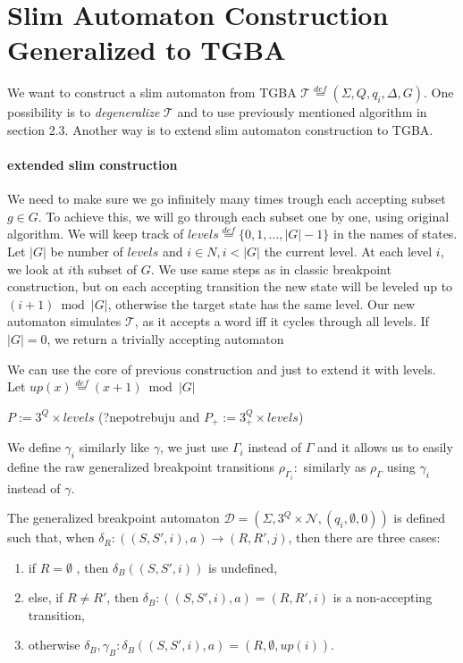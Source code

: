 \documentclass[
	digital
nolof, nolot
]{fithesis3}
\newcommand{\cD}{\mathcal{D}}
\newcommand{\cN}{\mathcal{N}}
\newcommand{\cT}{\mathcal{T}}
\newcommand{\eqdef}{\overset{def}{=}}
\begin{document}
			
			\section{Slim Automaton Construction Generalized to TGBA}
			We want to construct a slim automaton from TGBA $\cT\eqdef(\Sigma, Q, q_i, \Delta, G)$.
			One possibility is to \emph{degeneralize} $\cT$ and to use previously mentioned algorithm in section 2.3. Another way is to extend slim automaton construction to TGBA.
			\paragraph{extended slim construction}
			We need to make sure we go infinitely many times trough each accepting subset $g \in G$. To achieve this, we will go through each subset one by one, using original algorithm. We will keep track of $levels\eqdef\{0,1,\ldots,|G|-1\}$ in the names of states. Let $|G|$ be number of $levels$ and $i \in N, i<|G|$ the current level. At each level $i$, we look at $i$th subset of $G$. We use same steps as in classic breakpoint construction, but on each accepting transition the new state will be leveled up to $(i+1)\bmod|G|$, otherwise the target state has the same level. Our new automaton simulates $\cT$, as it accepts a word iff it cycles through all levels. If $|G|=0$, we return a trivially accepting automaton
			
			We can use the core of previous construction and just to extend it with levels. Let
			$up(x)\eqdef(x+1)\bmod|G|$ 
			
			
			$P := 3^Q \times levels$ (?nepotrebuju and $P_+ := 3^Q_+ \times levels$)
			
			
			We define $\gamma_i$ similarly like $\gamma$, we just use $\Gamma_i$ instead of $\Gamma$ and it allows us to easily define the raw generalized breakpoint transitions
			$\rho_{\Gamma_{i}}\colon$ similarly as $\rho_\Gamma$ using $\gamma_i$ instead of $\gamma$.
			
			The generalized breakpoint automaton $\cD=(\Sigma, 3^Q\times\cN, ({q_i},\emptyset, 0))$ is defined such that, when $\delta_R\colon((S, S', i), a) \rightarrow (R, R', j)$, then there are three cases:
			\begin{enumerate}
				\item if $R=\emptyset$ , then $\delta_B((S,S',i))$ is undefined,
				\item else, if $R \neq R'$, then $\delta_B\colon((S,S',i),a) = (R,R',i)$ is a non-accepting transition,
				\item otherwise $\delta_B, \gamma_B \colon \delta_B((S,S',i),a) = (R, \emptyset, up(i))$.
			\end{enumerate}
		
\end{document}
